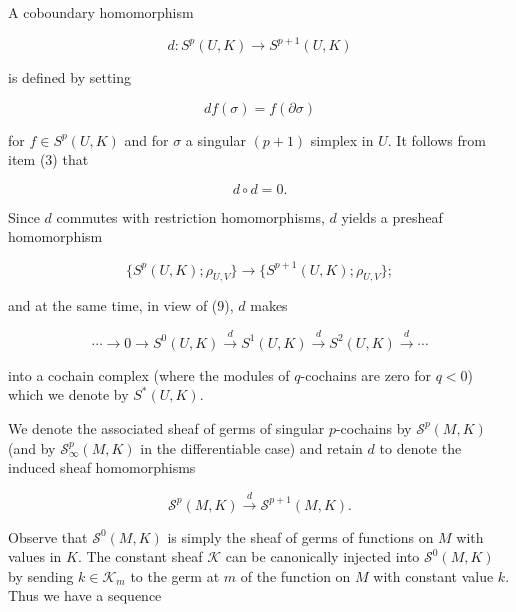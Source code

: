 A coboundary homomorphism

\begin{equation}
\tag{7}\label{eq:5.31:7}
d\colon S^{p}(U,K)\to S^{p+1}(U,K)
\end{equation}

is defined by setting

\begin{equation}
\tag{8}\label{eq:5.31:8}
d f(\sigma)=f(\partial\sigma)
\end{equation}

for $f \in S^p(U, K)$ and for $\sigma$ a singular $(p+1)$ simplex in $U$. It follows from item (3) that

\begin{equation}
\tag{9}\label{eq:5.31:9}
d\circ d=0.
\end{equation}

Since $d$ commutes with restriction homomorphisms, $d$ yields a presheaf homomorphism

\begin{equation}
\tag{10}\label{eq:5.31:10}
\{{S}^{p}(U,K);\rho_{U,V}\}\to\{{S}^{p+1}(U,K);\rho_{U,V}\};
\end{equation}

and at the same time, in view of (9), $d$ makes

\begin{equation}
\tag{11}\label{eq:5.31:11}
\cdots\to0\to S^{0}(U,K)\stackrel{d}{\longrightarrow}S^{1}(U,K)\stackrel{d}{\longrightarrow}S^{2}(U,K)\stackrel{d}{\longrightarrow}\cdots
\end{equation}

into a cochain complex (where the modules of $q$-cochains are zero for $q<0$) which we denote by  $ S^{*}(U,K) $.

We denote the associated sheaf of germs of singular $p$-cochains by $\mathcal{S}^{p}(M,K)$ (and by $\mathcal{S}_{\infty}^{p}(M,K)$ in the differentiable case) and retain $d$ to denote the induced sheaf homomorphisms

\begin{equation}
\tag{12}\label{eq:5.31:12}
\mathcal{S}^{p}(M,K)\xrightarrow{d}\mathcal{S}^{p+1}(M,K).
\end{equation}

Observe that $\mathcal{S}^{0}(M,K)$ is simply the sheaf of germs of functions on $M$ with values in $K$. The constant sheaf $\mathcal{K}$ can be canonically injected into $\mathcal{S}^{0}(M,K)$ by sending $k\in\mathcal{K}_{m}$ to the germ at $m$ of the function on $M$ with constant value $k$. Thus we have a sequence

